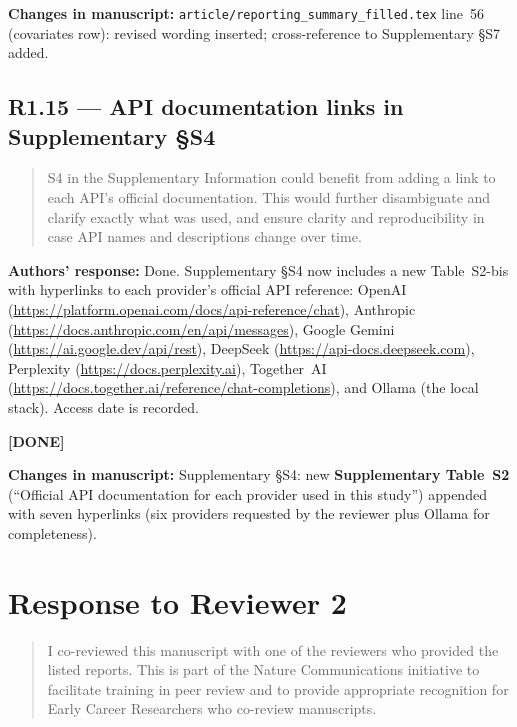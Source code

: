 \documentclass[11pt,a4paper]{article}
\newenvironment{revquote}{%
  \begin{quote}\small\itshape\color{revgray}
}{%
  \end{quote}
}
\newcommand{\response}[1]{\par\noindent\textbf{\color{revgreen}Authors' response:} #1\par}
\newcommand{\changes}[1]{\par\noindent\textbf{\color{revblue}Changes in manuscript:} #1\par}
\newcommand{\done}{\color{revgreen}\textbf{[DONE]}}
\begin{document}
\changes{\texttt{article/reporting\_summary\_filled.tex} line~56 (covariates row): revised wording inserted; cross-reference to Supplementary §S7 added.}

\subsection*{R1.15 --- API documentation links in Supplementary §S4}

\begin{revquote}
S4 in the Supplementary Information could benefit from adding a link to each API's official documentation. This would further disambiguate and clarify exactly what was used, and ensure clarity and reproducibility in case API names and descriptions change over time.
\end{revquote}

\response{Done. Supplementary §S4 now includes a new Table~S2-bis with hyperlinks to each provider's official API reference: OpenAI (\url{https://platform.openai.com/docs/api-reference/chat}), Anthropic (\url{https://docs.anthropic.com/en/api/messages}), Google Gemini (\url{https://ai.google.dev/api/rest}), DeepSeek (\url{https://api-docs.deepseek.com}), Perplexity (\url{https://docs.perplexity.ai}), Together~AI (\url{https://docs.together.ai/reference/chat-completions}), and Ollama (the local stack). Access date is recorded.} \done

\changes{Supplementary §S4: new \textbf{Supplementary Table~S2} (``Official API documentation for each provider used in this study'') appended with seven hyperlinks (six providers requested by the reviewer plus Ollama for completeness).}

\newpage
\section*{Response to Reviewer 2}

\begin{revquote}
I co-reviewed this manuscript with one of the reviewers who provided the listed reports. This is part of the Nature Communications initiative to facilitate training in peer review and to provide appropriate recognition for Early Career Researchers who co-review manuscripts.
\end{revquote}
\end{document}
